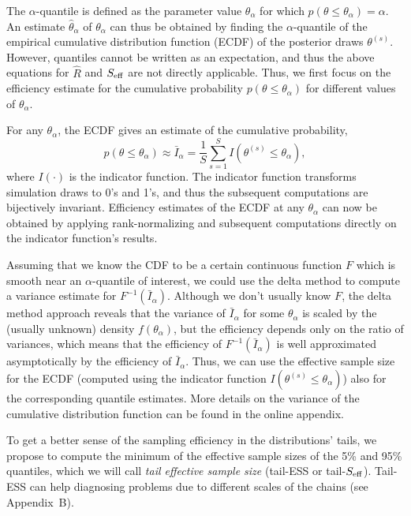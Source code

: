 \documentclass[american,]{article}
\theoremstyle{definition}
\begin{document}
The \(\alpha\)-quantile
is defined as the parameter value \(\theta_\alpha\) for which
\(p(\theta \leq \theta_\alpha) = \alpha\). An estimate
\(\hat{\theta}_\alpha\) of \(\theta_\alpha\) can thus be obtained by
finding the \(\alpha\)-quantile of the empirical cumulative distribution function (ECDF) of the
posterior draws \(\theta^{(s)}\). However, quantiles cannot be written
as an expectation, and thus the above equations for \(\widehat{R}\) and
\(S_{\rm eff}\) are not directly applicable. Thus, we first focus on the
efficiency estimate for the cumulative probability
\(p(\theta \leq \theta_\alpha)\) for different values of
\(\theta_\alpha\).

For any \(\theta_\alpha\), the ECDF gives an estimate of the cumulative
probability,
\begin{equation}
p(\theta \leq \theta_\alpha) \approx \bar{I}_\alpha = \frac{1}{S}\sum_{s=1}^S
I(\theta^{(s)} \leq\theta_\alpha),
\end{equation}
where \(I(\cdot)\) is the indicator function. The indicator function
transforms simulation draws to 0's and 1's, and thus the subsequent
computations are bijectively invariant. Efficiency estimates of the ECDF
at any \(\theta_\alpha\) can now be obtained by applying
rank-normalizing and subsequent computations directly on the indicator
function's results.

Assuming that we know the CDF to be a certain continuous function \(F\)
which is smooth near an \(\alpha\)-quantile of interest, we could use
the delta method to compute a variance estimate for
\(F^{-1}(\bar{I}_\alpha)\). Although we don't usually know \(F\), the
delta method approach reveals that the variance of \(\bar{I}_\alpha\)
for some \(\theta_\alpha\) is scaled by the (usually unknown) density
\(f(\theta_\alpha)\), but the efficiency depends only on the ratio of variances, which means that the efficiency of \(F^{-1}(\bar{I}_\alpha)\) is well approximated asymptotically by the  efficiency
of \(\bar{I}_\alpha\). Thus, we can use the effective sample size for
the ECDF (computed using the indicator function
\(I(\theta^{(s)} \leq \theta_\alpha)\)) also for the corresponding
quantile estimates. More details on the variance of the cumulative
distribution function can be found in the online appendix.

To get a better sense of the sampling efficiency in the
distributions' tails, we propose to compute the minimum of the effective
sample sizes of the 5\% and 95\% quantiles, which we will call
\emph{tail effective sample size} (tail-ESS or tail-\(S_{\rm eff}\)).
Tail-ESS can help diagnosing problems due to different scales of the
chains (see Appendix~B).
\end{document}
